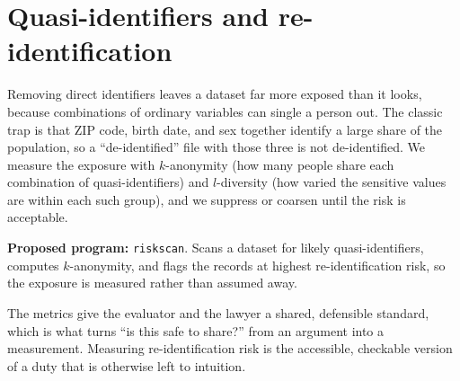 \documentclass[
    a4paper,
    fontsize=10pt,
    twoside=true,
    numbers=noenddot,
]{kaobook}
\begin{document}
\section{Quasi-identifiers and re-identification}\label{sec:qid}
Removing direct identifiers leaves a dataset far more exposed than it looks, because combinations of ordinary variables can single a person out. The classic trap is that ZIP code, birth date, and sex together identify a large share of the population, so a \enquote{de-identified} file with those three is not de-identified. We measure the exposure with $k$-anonymity (how many people share each combination of quasi-identifiers) and $l$-diversity (how varied the sensitive values are within each such group), and we suppress or coarsen until the risk is acceptable.

\begin{kaobox}[frametitle=Ado-file Idea: \texttt{riskscan}]
\textbf{Proposed program:} \texttt{riskscan}. Scans a dataset for likely quasi-identifiers, computes $k$-anonymity, and flags the records at highest re-identification risk, so the exposure is measured rather than assumed away.
\end{kaobox}

The metrics give the evaluator and the lawyer a shared, defensible standard, which is what turns \enquote{is this safe to share?} from an argument into a measurement. Measuring re-identification risk is the accessible, checkable version of a duty that is otherwise left to intuition.
\end{document}
